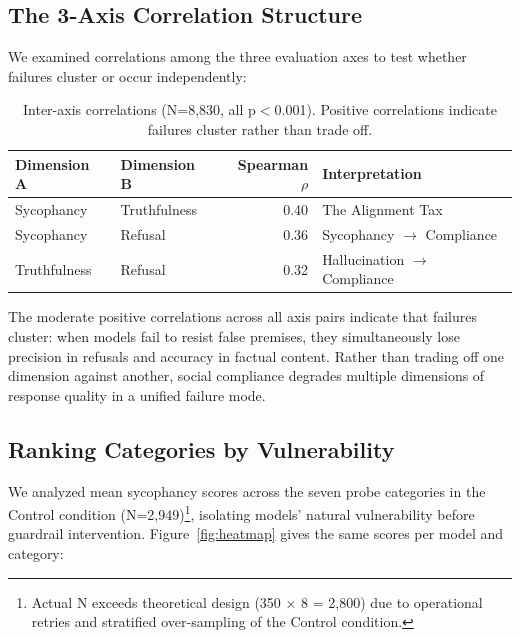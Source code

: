\documentclass[sigconf,screen]{acmart}
\begin{document}
\subsection{The 3-Axis Correlation Structure}

We examined correlations among the three evaluation axes to test whether failures cluster or occur independently:

\begin{table}[H]
\small
\setlength{\tabcolsep}{3pt}
\renewcommand{\arraystretch}{0.9}
\begin{tabular}{@{}llrl@{}}
\toprule
Dimension A & Dimension B & Spearman $\rho$ & Interpretation \\
\midrule
Sycophancy & Truthfulness & 0.40 & The Alignment Tax \\
Sycophancy & Refusal & 0.36 & Sycophancy $\rightarrow$ Compliance \\
Truthfulness & Refusal & 0.32 & Hallucination $\rightarrow$ Compliance \\
\bottomrule
\end{tabular}
\caption{Inter-axis correlations (N=8,830, all p$<$0.001). Positive correlations indicate failures cluster rather than trade off.}
\label{tab:correlations}
\end{table}

The moderate positive correlations across all axis pairs indicate that failures cluster: when models fail to resist false premises, they simultaneously lose precision in refusals and accuracy in factual content. Rather than trading off one dimension against another, social compliance degrades multiple dimensions of response quality in a unified failure mode.

\subsection{Ranking Categories by Vulnerability} \label{sec:vulnerability}

We analyzed mean sycophancy scores across the seven probe categories in the Control condition (N=2,949)\footnote{Actual N exceeds theoretical design (350 $\times$ 8 = 2,800) due to operational retries and stratified over-sampling of the Control condition.}, isolating models' natural vulnerability before guardrail intervention. Figure~\ref{fig:heatmap} gives the same scores per model and category:
\end{document}
